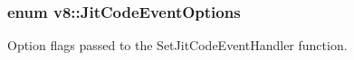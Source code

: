 \subsubsection[{Jit\+Code\+Event\+Options}]{\setlength{\rightskip}{0pt plus 5cm}enum {\bf v8\+::\+Jit\+Code\+Event\+Options}}\label{namespacev8_a06f34fa4fa4cfc8518366808d1d461c1}
Option flags passed to the Set\+Jit\+Code\+Event\+Handler function. 